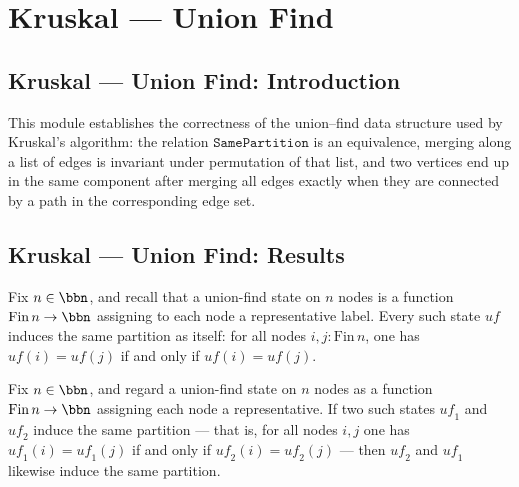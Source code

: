 \section{Kruskal --- Union Find}
\subsection*{Kruskal --- Union Find: Introduction}

This module establishes the correctness of the union--find data structure used by
Kruskal's algorithm: the relation $\mathtt{SamePartition}$ is an equivalence, merging
along a list of edges is invariant under permutation of that list, and two vertices end
up in the same component after merging all edges exactly when they are connected by a
path in the corresponding edge set.

\subsection*{Kruskal --- Union Find: Results}

\begin{lemma}
\label{Kruskal.UF.SamePartition.rfl}
\leanok
{}
Fix $n \in \bbn$, and recall that a union-find state on $n$ nodes is a function
$\mathrm{Fin}\,n \to \bbn$ assigning to each node a representative label. Every such
state $\mathit{uf}$ induces the same partition as itself: for all nodes $i, j :
\mathrm{Fin}\,n$, one has $\mathit{uf}(i) = \mathit{uf}(j)$ if and only if
$\mathit{uf}(i) = \mathit{uf}(j)$.
\end{lemma}

\begin{lemma}
\label{Kruskal.UF.SamePartition.symm}
\leanok
{}
Fix $n \in \bbn$, and regard a union-find state on $n$ nodes as a function
$\mathrm{Fin}\,n \to \bbn$ assigning each node a representative. If two such states
$\mathit{uf}_1$ and $\mathit{uf}_2$ induce the same partition — that is, for all nodes
$i, j$ one has $\mathit{uf}_1(i) = \mathit{uf}_1(j)$ if and only if $\mathit{uf}_2(i) =
\mathit{uf}_2(j)$ — then $\mathit{uf}_2$ and $\mathit{uf}_1$ likewise induce the same
partition.
\end{lemma}

